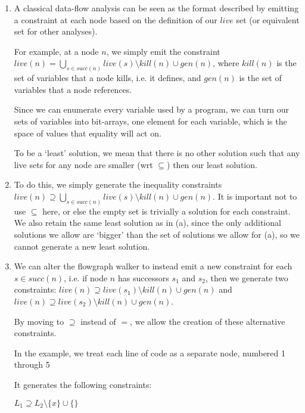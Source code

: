 


\begin{enumerate}[label=(\alph*)]
  \item

    A classical data-flow analysis can be seen as the format described by emitting a constraint at each node based on the definition of our $live$ set (or equivalent set for other analyses).

    For example, at a node $n$, we simply emit the constraint $live(n) = \bigcup_{s \in succ(n)} live(s) \setminus kill(n) \cup gen(n)$, where $kill(n)$ is the set of variables that a node kills, i.e. it defines, and $gen(n)$ is the set of variables that a node references.

    Since we can enumerate every variable used by a program, we can turn our sets of variables into bit-arrays, one element for each variable, which is the space of values that equality will act on.

    To be a `least' solution, we mean that there is no other solution such that any live sets for any node are smaller (wrt $\subseteq$) then our least solution.

  \item
    To do this, we simply generate the inequality constraints $live(n) \supseteq \bigcup_{s \in succ(n)} live(s) \setminus kill(n) \cup gen(n)$. It is important not to use $\subseteq$ here, or else the empty set is trivially a solution for each constraint. We also retain the same least solution as in (a), since the only additional solutions we allow are `bigger' than the set of solutions we allow for (a), so we cannot generate a new least solution.

  \item
    We can alter the flowgraph walker to instead emit a new constraint for each $s \in succ(n)$, i.e. if node $n$ has successors $s_1$ and $s_2$, then we generate two constraints: $live(n) \supseteq live(s_1) \setminus kill(n) \cup gen(n)$ and $live(n) \supseteq live(s_2) \setminus kill(n) \cup gen(n)$.

    By moving to $\supseteq$ instead of $=$, we allow the creation of these alternative constraints.

    In the example, we treat each line of code as a separate node, numbered 1 through 5

    It generates the following constraints:

    $L_1 \supseteq L_2 \setminus \{x\} \cup \{\}$


\end{enumerate}

